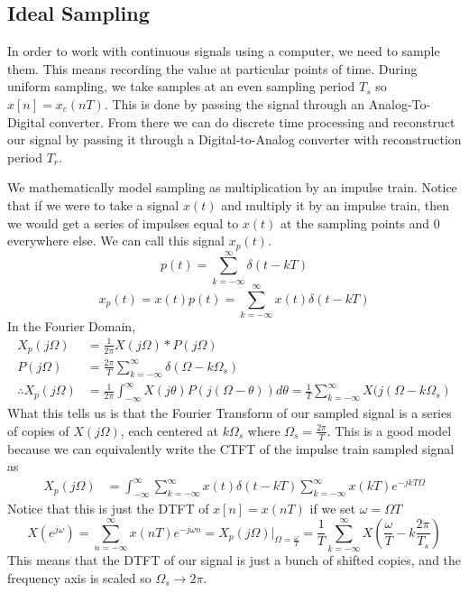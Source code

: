 \documentclass{article}
\begin{document}
\subsection{Ideal Sampling}
In order to work with continuous signals using a computer, we need to sample them. This means recording the value at particular points of time.
During uniform sampling, we take samples at an even sampling period $T_s$ so $x[n]=x_c(nT)$. This is done by passing the signal through an Analog-To-Digital converter.
From there we can do discrete time processing and reconstruct our signal by passing it through a Digital-to-Analog converter with reconstruction period $T_r$.
\begin{figure}[H]
  \centering
\end{figure}
We mathematically model sampling as multiplication by an impulse train. Notice that if we were to take a signal $x(t)$ and multiply it by an impulse train, then we would get a series of impulses
equal to $x(t)$ at the sampling points and $0$ everywhere else. We can call this signal $x_p(t)$.
$$p(t) = \sum_{k=-\infty}^{\infty}{\delta(t-kT)}$$
$$x_p(t) = x(t)p(t) = \sum_{k=-\infty}^{\infty}{x(t)\delta(t-kT)}$$
In the Fourier Domain,
\begin{align*}
    X_p(j\Omega) &= \frac{1}{2\pi}X(j\Omega)*P(j\Omega)\\
    P(j\Omega) &= \frac{2\pi}{T}\sum_{k=-\infty}^{\infty}{\delta(\Omega-k\Omega_s)}\\
    \therefore X_p(j\Omega) &= \frac{1}{2\pi}\int_{-\infty}^{\infty}{X(j\theta)P(j(\Omega-\theta))d\theta} = \frac{1}{T}\sum_{k=-\infty}^{\infty}{X(j(\Omega-k\Omega_s)}
\end{align*}
What this tells us is that the Fourier Transform of our sampled signal is a series of copies of $X(j\Omega)$, each centered
at $k\Omega_s$ where $\Omega_s = \frac{2\pi}{T}$. This is a good model because we can equivalently write the CTFT of the impulse train sampled signal as
\begin{align*}
  X_p(j\Omega) &= \int_{-\infty}^{\infty}\sum_{k=-\infty}^{\infty}{x(t)\delta(t-kT)} \sum_{k=-\infty}^{\infty}x(kT)e^{-jkT\Omega} 
\end{align*}
Notice that this is just the DTFT of $x[n]=x(nT)$ if we set $\omega = \Omega T$
$$X(e^{j\omega}) = \sum_{n=-\infty}^{\infty}x(nT)e^{-j\omega n}=X_p(j\Omega)|_{\Omega=\frac{\omega}{T}}=\frac{1}{T}\sum_{k=-\infty}^{\infty}{X\left(\frac{\omega}{T}-k\frac{2\pi}{T_s}\right)}$$
This means that the DTFT of our signal is just a bunch of shifted copies, and the frequency axis is scaled so $\Omega_s \rightarrow 2\pi$.
\end{document}
